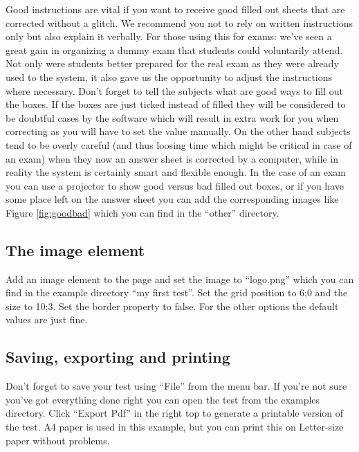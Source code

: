 \documentclass[10pt,a4paper]{article}
\begin{document}
Good instructions are vital if you want to receive good filled out sheets that are corrected without a glitch. We recommend you not to rely on written instructions only but also explain it verbally. For those using this for exams: we've seen a great gain in organizing a dummy exam that students could voluntarily attend. Not only were students better prepared for the real exam as they were already used to the system, it also gave us the opportunity to adjust the instructions where necessary. Don't forget to tell the subjects what are good ways to fill out the boxes. If the boxes are just ticked instead of filled they will be considered to be doubtful cases by the software which will result in extra work for you when correcting as you will have to set the value manually. On the other hand subjects tend to be overly careful (and thus loosing time which might be critical in case of an exam) when they now an answer sheet is corrected by a computer, while in reality the system is certainly smart and flexible enough. In the case of an exam you can use a projector to show good versus bad filled out boxes, or if you have some place left on the answer sheet you can add the corresponding images like Figure \ref{fig:goodbad} which you can find in the ``other'' directory.


\subsection*{The image element}

Add an image element to the page and set the image to ``logo.png'' which you can find in the example directory ``my first test''. Set the grid position to 6;0 and the size to 10;3. Set the border property to false. For the other options the default values are just fine.


\subsection*{Saving, exporting and printing}

Don't forget to save your test using ``File'' from the menu bar. If you're not sure you've got everything done right you can open the test from the examples directory. Click ``Export Pdf'' in the right top to generate a printable version of the test. A4 paper is used in this example, but you can print this on Letter-size paper without problems.
\end{document}
